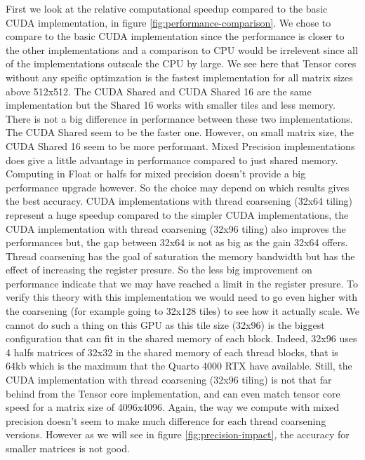 \documentclass[conference]{IEEEtran}
\begin{document}
  First we look at the relative computational speedup compared to the basic CUDA implementation, in figure \ref{fig:performance-comparison}.
  We chose to compare to the basic CUDA implementation since the performance is closer to 
  the other implementations and a comparison to CPU would be irrelevent since all of the implementations
  outscale the CPU by large. 
  We see here that Tensor cores without any speific optimzation is the fastest implementation for all matrix sizes above 512x512.
  The CUDA Shared and CUDA Shared 16 are the same implementation but the Shared 16 works with smaller tiles and less 
  memory. There is not a big difference in performance between these two implementations. The CUDA Shared seem to be the faster one. However,
  on small matrix size, the CUDA Shared 16 seem to be more performant.
  Mixed Precision implementations does give a little advantage in performance compared to just shared memory.
  Computing in Float or halfs for mixed precision doesn't provide a big performance upgrade however. So the choice may depend on which results
  gives the best accuracy.
  CUDA implementations with thread coarsening (32x64 tiling) represent a huge
  speedup compared to the simpler CUDA implementations, the CUDA implementation with thread coarsening (32x96 tiling) also improves
  the performances but, the gap between 32x64 is not as big as the gain 32x64 offers. Thread coarsening has the goal
  of saturation the memory bandwidth but has the effect of increasing the register presure. So the less big improvement on performance
  indicate that we may have reached a limit in the register presure.
  To verify this theory with this implementation we would need to go even higher with the coarsening (for example going to 32x128 tiles) to see how it actually scale.
  We cannot do such a thing on this GPU as this tile size (32x96) is the biggest configuration that can fit in the shared memory of each block.
  Indeed, 32x96 uses 4 halfs matrices of 32x32 in the shared memory of each thread blocks, that is 64kb which is the maximum that the Quarto 4000 RTX have available.
  Still, the CUDA implementation with thread coarsening (32x96 tiling) is not that far behind from the Tensor core implementation, and can even match 
  tensor core speed for a matrix size of 4096x4096.
  Again, the way we compute with mixed precision doesn't seem to make much difference for each thread coarsening versions.
  However as we will see in figure \ref{fig:precision-impact}, the accuracy for smaller matrices is not good.
  
\end{document}
